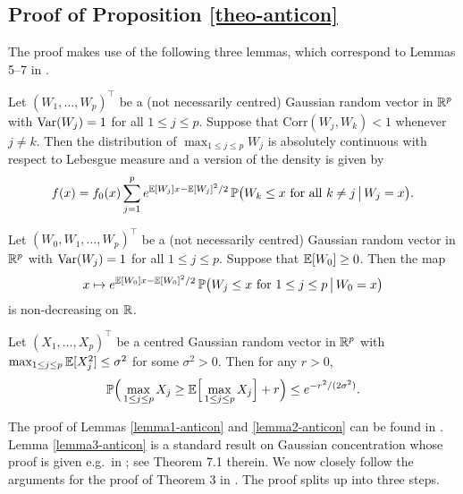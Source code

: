 \documentclass[a4paper,12pt]{article}
\begin{document}
\subsection*{Proof of Proposition \ref{theo-anticon}}

 
The proof makes use of the following three lemmas, which correspond to Lemmas 5--7 in \cite{Chernozhukov2015}. 
\begin{lemmaA}\label{lemma1-anticon}
Let $(W_1,\ldots,W_p)^\top$ be a (not necessarily centred) Gaussian random vector in $\mathbb{R}^p$ with $\textnormal{Var}(W_j) = 1$ for all $1 \le j \le p$. Suppose that $\text{Corr}(W_j,W_k) < 1$ whenever $j \ne k$. Then the distribution of $\max_{1 \le j \le p} W_j$ is absolutely continuous with respect to Lebesgue measure and a version of the density is given by 
\[ f(x) = f_0(x) \sum\limits_{j=1}^p e^{\mathbb{E}[W_j]x - \mathbb{E}[W_j]^2/2} \, \mathbb{P} \big(W_k \le x \text{ for all } k \ne j \, \big| \, W_j = x \big). \]
\end{lemmaA}
\begin{lemmaA}\label{lemma2-anticon}
Let $(W_0,W_1,\ldots,W_p)^\top$ be a (not necessarily centred) Gaussian random vector in $\mathbb{R}^p$ with $\textnormal{Var}(W_j) = 1$ for all $1 \le j \le p$. Suppose that $\mathbb{E}[W_0] \ge 0$. Then the map 
\[ x \mapsto  e^{\mathbb{E}[W_0]x - \mathbb{E}[W_0]^2/2} \, \mathbb{P} \big(W_j \le x \text{ for } 1 \le j \le p \, \big| \, W_0 = x \big) \]
is non-decreasing on $\mathbb{R}$. 
\end{lemmaA}
\begin{lemmaA}\label{lemma3-anticon}
Let $(X_1,\ldots,X_p)^\top$ be a centred Gaussian random vector in $\mathbb{R}^p$ with $\max_{1 \le j \le p} \mathbb{E}[X_j^2] \le \sigma^2$ for some $\sigma^2 > 0$. Then for any $r > 0$, 
\[ \mathbb{P} \Big( \max_{1 \le j \le p} X_j \ge \mathbb{E} \Big[ \max_{1 \le j \le p} X_j \Big] + r \Big) \le e^{-r^2/(2\sigma^2)}. \]
\end{lemmaA} 
The proof of Lemmas \ref{lemma1-anticon} and \ref{lemma2-anticon} can be found in \cite{Chernozhukov2015}. Lemma \ref{lemma3-anticon} is a standard result on Gaussian concentration whose proof is given e.g.\ in \cite{Ledoux2001}; see Theorem 7.1 therein. We now closely follow the arguments for the proof of Theorem 3 in \cite{Chernozhukov2015}. The proof splits up into three steps. 
\vspace{7pt}
\end{document}
